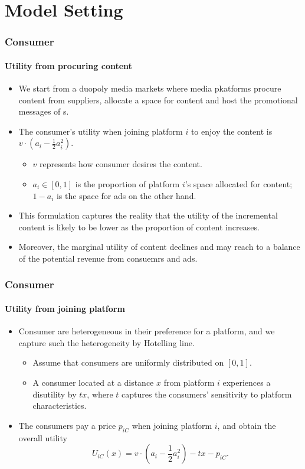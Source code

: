 \documentclass{beamer}
\newcommand{\hl}[1]{\textcolor{myblue}{#1}}
\newcommand{\adv}{\text{advertiser}}
\begin{document}
\section{Model Setting} 
\begin{frame}%
    \frametitle{Consumer}
    \framesubtitle{Utility from procuring content}
    \begin{itemize}
        \item We start from a duopoly media markets where
            media pkatforms procure content from suppliers, 
            allocate a space for content and host the promotional
            messages of \adv s.
        \item The consumer's utility when joining platform $i$ to enjoy the content
            is $v\cdot\left(a_i-\frac{1}{2}a_i^2\right)$.
            \begin{itemize}
                \item $v$ represents how consumer desires the content.
                \item $a_i\in[0,1]$ is the proportion of platform $i$'s space
                    allocated for content; $1-a_i$ is the space for ads on
                    the other hand.
            \end{itemize}
        \item This formulation \hl{captures the reality that the utility of the
            incremental content is likely to be lower as the proportion of content
            increases.}
        \item Moreover, the marginal utility of content declines and may reach to a 
            balance of the potential revenue from consuemrs and ads.
    \end{itemize}
\end{frame}

\begin{frame}%
    \frametitle{Consumer}
    \framesubtitle{Utility from joining platform}
    \begin{itemize}
        \item Consumer are heterogeneous in their preference for a platform,
            and we capture such the heterogeneity by \hl{Hotelling line}.
            \begin{itemize}
                \item Assume that consumers are uniformly distributed on $[0,1]$.
                \item A consumer located at a distance $x$ from platform $i$
                    experiences a disutility by $tx$, where $t$ captures the
                    consumers' sensitivity to platform characteristics.
            \end{itemize}
        \item The consumers pay a price $p_{iC}$ when joining platform $i$,
            and obtain the overall utility
            \[
                U_{iC}(x)=v\cdot\left(a_i-\frac{1}{2}a_i^2\right)
                -tx-p_{iC}.
            \]
    \end{itemize}
\end{frame}
\end{document}

